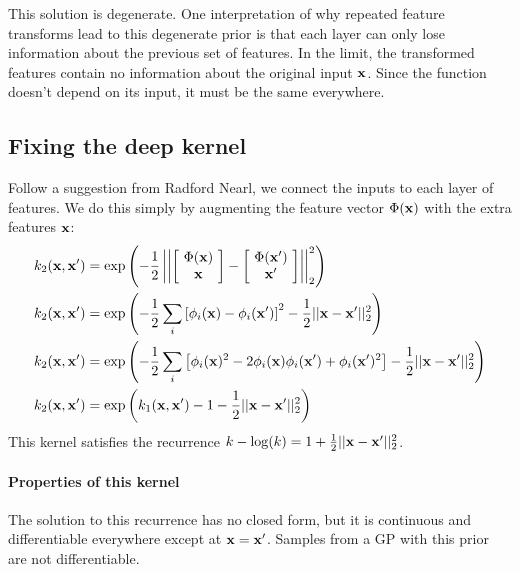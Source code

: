 \documentclass{article}
\begin{document}
This solution is degenerate.  One interpretation of why repeated feature transforms lead to this degenerate prior is that each layer can only lose information about the previous set of features.  In the limit, the transformed features contain no information about the original input ${\bf{x}}$.  Since the function doesn't depend on its input, it must be the same everywhere.



\subsection{Fixing the deep kernel}

Follow a suggestion from Radford Nearl, we connect the inputs to each layer of features.  We do this simply by augmenting the feature vector $\Phi({\bf{x}})$ with the extra features ${\bf{x}}$:
%
\begin{align}
k_2({\bf{x}}, {\bf{x}}') & = \exp \left( -\frac{1}{2} \left|\left| \left[ \! \begin{array}{c} \Phi({\bf{x}}) \\ {\bf{x}} \end{array} \! \right]  - \left[ \! \begin{array}{c} \Phi({\bf{x}}') \\ {\bf{x}}' \end{array} \! \right] \right| \right|_2^2 \right) \\
k_2({\bf{x}}, {\bf{x}}') & = \exp \left( -\frac{1}{2} \sum_i \left[ \phi_i({\bf{x}}) - \phi_i({\bf{x}}') \right]^2 -\frac{1}{2} || {\bf{x}} - {\bf{x}}' ||_2^2 \right) \\
k_2({\bf{x}}, {\bf{x}}') & = \exp\left ( -\frac{1}{2} \sum_i \left[ \phi_i({\bf{x}})^2 - 2 \phi_i({\bf{x}}) \phi_i({\bf{x}}') + \phi_i({\bf{x}}')^2 \right]  -\frac{1}{2} || {\bf{x}} - {\bf{x}}' ||_2^2 \right) \\
k_2({\bf{x}}, {\bf{x}}') & = \exp \left( k_1({\bf{x}}, {\bf{x}}') - 1 -\frac{1}{2} || {\bf{x}} - {\bf{x}}' ||_2^2 \right)
\end{align}
%
This kernel satisfies the recurrence $k - \log(k) = 1 + \frac{1}{2} || {\bf{x}} - {\bf{x}}' ||_2^2$.  

\paragraph{Properties of this kernel} The solution to this recurrence has no closed form, but it is continuous and differentiable everywhere except at ${\bf{x}} = {\bf{x}}'$.  Samples from a GP with this prior are not differentiable.
\end{document}
